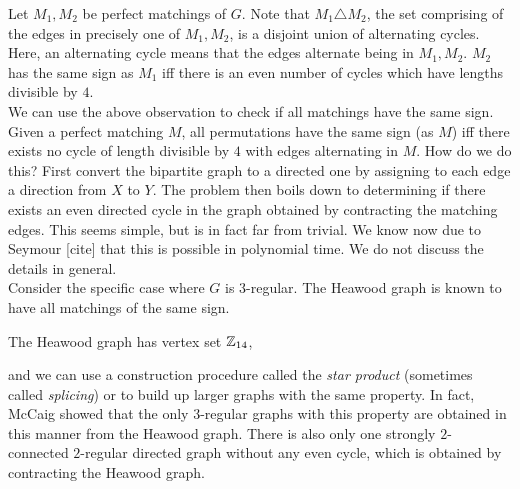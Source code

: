 Let $M_1,M_2$ be perfect matchings of $G$. Note that $M_1 \triangle M_2$, the set comprising of the edges in precisely one of $M_1,M_2$, is a disjoint union of alternating cycles. Here, an alternating cycle means that the edges alternate being in $M_1,M_2$. $M_2$ has the same sign as $M_1$ iff there is an even number of cycles which have lengths divisible by $4$.\\
We can use the above observation to check if all matchings have the same sign. Given a perfect matching $M$, all permutations have the same sign (as $M$) iff there exists no cycle of length divisible by $4$ with edges alternating in $M$. How do we do this? First convert the bipartite graph to a directed one by assigning to each edge a direction from $X$ to $Y$. The problem then boils down to determining if there exists an even directed cycle in the graph obtained by contracting the matching edges. This seems simple, but is in fact far from trivial. We know now due to Seymour [cite] that this is possible in polynomial time. We do not discuss the details in general. \\
Consider the specific case where $G$ is $3$-regular. The Heawood graph is known to have all matchings of the same sign.
\begin{fex}
	The Heawood graph has vertex set $\mathbb{Z}_{14}$, 
\end{fex}
and we can use a construction procedure called the \emph{star product} (sometimes called \emph{splicing}) or to build up larger graphs with the same property. In fact, McCaig showed that the only $3$-regular graphs with this property are obtained in this manner from the Heawood graph. There is also only one strongly $2$-connected $2$-regular directed graph without any even cycle, which is obtained by contracting the Heawood graph. %


